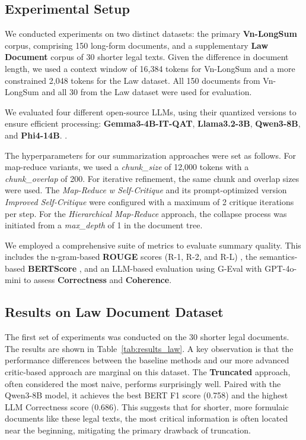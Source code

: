 \documentclass[11pt]{article}
\begin{document}
\subsection{Experimental Setup}
We conducted experiments on two distinct datasets: the primary \textbf{Vn-LongSum} corpus, comprising 150 long-form documents, and a supplementary \textbf{Law Document} corpus of 30 shorter legal texts. Given the difference in document length, we used a context window of 16,384 tokens for Vn-LongSum and a more constrained 2,048 tokens for the Law dataset. All 150 documents from Vn-LongSum and all 30 from the Law dataset were used for evaluation.

We evaluated four different open-source LLMs, using their quantized versions to ensure efficient processing: \textbf{Gemma3-4B-IT-QAT}, \textbf{Llama3.2-3B}, \textbf{Qwen3-8B}, and \textbf{Phi4-14B}. \citep{gemma-team2024gemma, grattafiori2024llama3, qwen-team2024qwen2.5, gunasekar2023textbooks}.

The hyperparameters for our summarization approaches were set as follows. For map-reduce variants, we used a \textit{chunk\_size} of 12,000 tokens with a \textit{chunk\_overlap} of 200. For iterative refinement, the same chunk and overlap sizes were used. The \textit{Map-Reduce w Self-Critique} and its prompt-optimized version \textit{Improved Self-Critique} were configured with a maximum of 2 critique iterations per step. For the \textit{Hierarchical Map-Reduce} approach, the collapse process was initiated from a \textit{max\_depth} of 1 in the document tree.

We employed a comprehensive suite of metrics to evaluate summary quality. This includes the n-gram-based \textbf{ROUGE} scores (R-1, R-2, and R-L) \citep{lin-2004-rouge}, the semantics-based \textbf{BERTScore} \citep{zhang2019bertscore}, and an LLM-based evaluation using G-Eval \citep{liu2023geval} with GPT-4o-mini to assess \textbf{Correctness} and \textbf{Coherence}.

\subsection{Results on Law Document Dataset}
The first set of experiments was conducted on the 30 shorter legal documents. The results are shown in Table~\ref{tab:results_law}. A key observation is that the performance differences between the baseline methods and our more advanced critic-based approach are marginal on this dataset. The \textbf{Truncated} approach, often considered the most naive, performs surprisingly well. Paired with the Qwen3-8B model, it achieves the best BERT F1 score (0.758) and the highest LLM Correctness score (0.686). This suggests that for shorter, more formulaic documents like these legal texts, the most critical information is often located near the beginning, mitigating the primary drawback of truncation.
\end{document}

